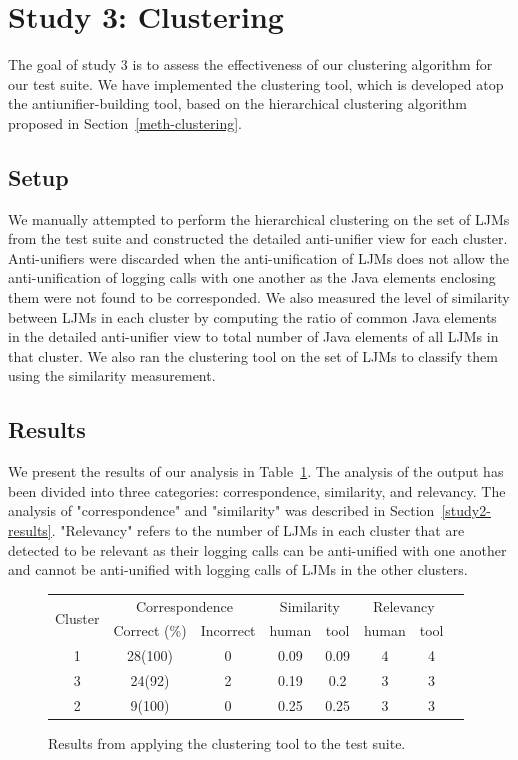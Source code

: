 \section{Study 3: Clustering}  \label{study3}
The goal of study 3 is to assess the effectiveness of our clustering algorithm for our test suite. We have implemented the clustering tool, which is developed atop the antiunifier-building tool, based on the hierarchical clustering algorithm proposed in Section~\ref{meth-clustering}.


\subsection{Setup}  \label{study3-setup}
We manually attempted to perform the hierarchical clustering on the set of LJMs from the test suite and constructed the detailed anti-unifier view for each cluster. Anti-unifiers were discarded when the anti-unification of LJMs does not allow the anti-unification of logging calls with one another as the Java elements enclosing them were not found to be corresponded. We also measured the level of similarity between LJMs in each cluster by computing the ratio of common Java elements in the detailed anti-unifier view to total number of Java elements of all LJMs in that cluster. We also ran the clustering tool on the set of LJMs to classify them using the similarity measurement.

\subsection{Results}  \label{study3-results}
We present the results of our analysis in Table~\ref{results_clustering}. The analysis of the output has been divided into three categories: correspondence, similarity, and relevancy. The analysis of "correspondence" and "similarity" was described in Section~\ref{study2-results}. "Relevancy" refers to the number of LJMs in each cluster that are detected to be relevant as their logging calls can be anti-unified with one another and cannot be anti-unified with logging calls of LJMs in the other clusters.

\begin{figure}
  \centering
  \begin{tabular}{|c|c|c|c|c|c|c|c|}
    \hline
  
    \multirow{2}{*}{Cluster}&\multicolumn{2}{c|}{Correspondence}&\multicolumn{2}{c|}{Similarity}&\multicolumn{2}{c|}{Relevancy}\\
    \cline{2-7}
    &Correct (\%)&Incorrect&human&tool&human&tool\\
    \hline
    1&28(100)&0&0.09&0.09  &4&4\\
    \hline
    3&24(92)&2&0.19&0.2& 3&3\\
    \hline
      2&9(100)&0&0.25&0.25& 3&3\\
 	\hline
  \end{tabular}
  \caption{Results from applying the clustering tool to the test suite.}
  \label{results_clustering}
\end{figure}

